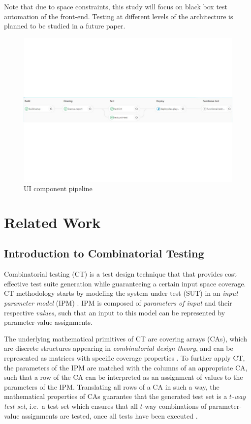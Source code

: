 \documentclass[conference]{IEEEtran}
\begin{document}
Note that due to space constraints, this study will focus on black box test automation of the front-end. Testing at different levels of the architecture is planned to be studied in a future paper. 

\begin{figure}[!t]
	\centering
	\includegraphics[width=1.00\textwidth]{UIpipeline.pdf}
	\caption{UI component pipeline}
	\label{fig:UIpipeline}
\end{figure}

\section{Related Work}

	\subsection{Introduction to Combinatorial Testing}
	Combinatorial testing (CT) is a test design technique that that provides cost effective test suite generation
	while guaranteeing a certain input space coverage.
	CT methodology starts by modeling the system under test (SUT) in an \emph{input parameter model} (IPM) \cite{OffuttIPM}.
	IPM is composed of \emph{parameters of input} and their respective \emph{values},
	such that an input to this model can be represented by parameter-value assignments.
	
	The underlying mathematical primitives of CT are covering arrays (CAs), which are discrete structures appearing in \emph{combinatorial design theory},
	and can be represented as matrices with specific coverage properties \cite{NISTpractical}.
	To further apply CT, the parameters of the IPM are matched with the columns of an appropriate CA,
	such that a row of the CA can be interpreted as an assignment of values to the parameters of the IPM.
	Translating all rows of a CA in such a way, the mathematical properties of CAs guarantee that the generated test set
	is a \emph{$t$-way test set}, i.e.\ a test set which ensures that all $t$-way combinations of parameter-value assignments are tested,
	once all tests have been executed \cite{NISTpractical}.
	
\end{document}
